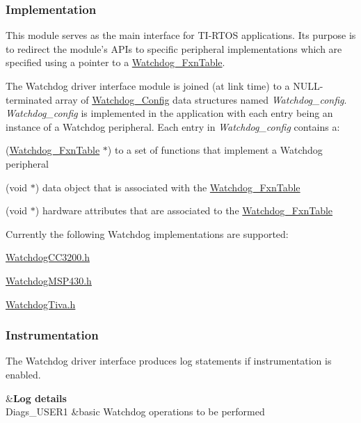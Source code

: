 \subsubsection*{Implementation}

This module serves as the main interface for T\-I-\/\-R\-T\-O\-S applications. Its purpose is to redirect the module's A\-P\-Is to specific peripheral implementations which are specified using a pointer to a \hyperlink{struct_watchdog___fxn_table}{Watchdog\-\_\-\-Fxn\-Table}.

The Watchdog driver interface module is joined (at link time) to a N\-U\-L\-L-\/terminated array of \hyperlink{struct_watchdog___config}{Watchdog\-\_\-\-Config} data structures named {\itshape Watchdog\-\_\-config}. {\itshape Watchdog\-\_\-config} is implemented in the application with each entry being an instance of a Watchdog peripheral. Each entry in {\itshape Watchdog\-\_\-config} contains a\-:
\begin{DoxyItemize}
\item (\hyperlink{struct_watchdog___fxn_table}{Watchdog\-\_\-\-Fxn\-Table} $\ast$) to a set of functions that implement a Watchdog peripheral
\item (void $\ast$) data object that is associated with the \hyperlink{struct_watchdog___fxn_table}{Watchdog\-\_\-\-Fxn\-Table}
\item (void $\ast$) hardware attributes that are associated to the \hyperlink{struct_watchdog___fxn_table}{Watchdog\-\_\-\-Fxn\-Table}
\end{DoxyItemize}

Currently the following Watchdog implementations are supported\-:
\begin{DoxyItemize}
\item \hyperlink{_watchdog_c_c3200_8h}{Watchdog\-C\-C3200.\-h}
\item \hyperlink{_watchdog_m_s_p430_8h}{Watchdog\-M\-S\-P430.\-h}
\item \hyperlink{_watchdog_tiva_8h}{Watchdog\-Tiva.\-h}
\end{DoxyItemize}

\subsubsection*{Instrumentation}

The Watchdog driver interface produces log statements if instrumentation is enabled.

\begin{TabularC}{2}
\hline
{}&{\bf Log details  }\\
Diags\-\_\-\-U\-S\-E\-R1 &basic Watchdog operations to be performed \\
\end{TabularC}


